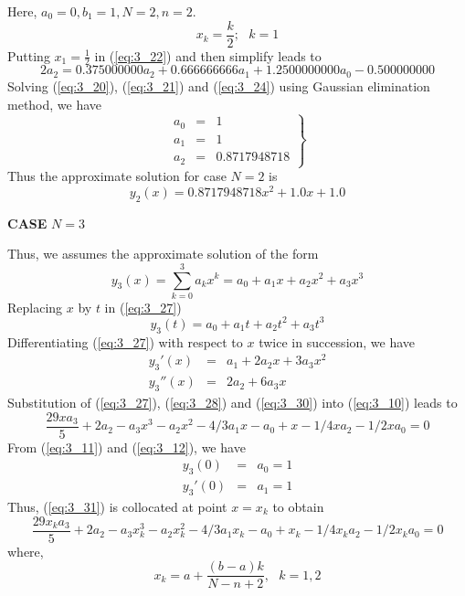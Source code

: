 \documentclass[12pt]{report}
\newcommand{\sps}{\\[0.2cm]}
\newcommand{\refn}[1]{(\ref{#1})}
\newcommand{\bt}[1]{\textbf{#1}}
\newcommand{\sprime}{'}
\newcommand{\dprime}{''}
\begin{document}
	Here, $a_0=0, b_1=1, N=2, n=2$.
	\begin{equation*}
		x_k = \frac{k}{2}; ~~~ k = 1
	\end{equation*}
	Putting $x_1 = \frac{1}{2}$ in \refn{eq:3_22} and then simplify leads to
	\begin{equation}
		2a_2 = 0.375000000a_2 + 0.666666666a_1 + 1.2500000000a_0 - 0.500000000 \label{eq:3_24}
	\end{equation}
	Solving \refn{eq:3_20}, \refn{eq:3_21} and \refn{eq:3_24} using Gaussian elimination method, we have
	\begin{equation}
		\left. 
			\begin{array}{rcl}
				a_0 &=&1\sps
				a_1 &=&1 \sps
				a_2 &=&0.8717948718
			\end{array}
		\right\}
		\label{eq:3_25}
	\end{equation}
	Thus the approximate solution for case $N=2$ is 
	\begin{equation}
		y_2(x) = 0.8717948718x^2 + 1.0x+1.0 \label{eq:2_26}
	\end{equation}
	\begin{center}
		\large \bt{CASE} $N=3$
	\end{center}
	Thus, we assumes the approximate solution of the form
	\begin{equation}
		y_3(x) = \sum_{k=0}^{3}a_kx^k = a_0 +a_1x+a_2x^2+a_3x^3 \label{eq:3_27}
	\end{equation}
	Replacing $x$ by $t$ in \refn{eq:3_27}
	\begin{equation}
		y_3(t) = a_0 +a_1t+a_2t^2+a_3t^3 \label{eq:3_28}
	\end{equation}
	Differentiating \refn{eq:3_27} with respect to $x$ twice in succession, we have
	\begin{eqnarray}
		y_3\sprime(x) &=& a_1 + 2a_2x + 3a_3x^2 \label{eq:3_29}\sps
		y_3\dprime(x) &=& 2a_2 + 6a_3x \label{eq:3_30}
	\end{eqnarray}
	Substitution of \refn{eq:3_27}, \refn{eq:3_28} and \refn{eq:3_30} into \refn{eq:3_10} leads to
	\begin{equation}
		\frac{29xa_3}{5} + 2a_2 - a_3x^3 - a_2x^2 - 4/3a_1x - a_0 + x-1/4xa_2 -  1/2xa_0 = 0 \label{eq:3_31}
	\end{equation}
	From \refn{eq:3_11} and \refn{eq:3_12}, we have
	\begin{eqnarray}
		y_3(0) &=& a_0 = 1 \label{eq:3_32}\sps
		y_3\sprime(0) &=& a_1 = 1 \label{eq:3_33}
	\end{eqnarray}
	Thus, \refn{eq:3_31} is collocated at point $x=x_k$ to obtain
	\begin{equation}
		\frac{29x_ka_3}{5} + 2a_2 - a_3x_k^3 - a_2x_k^2 - 4/3a_1x_k - a_0 + x_k - 1/4x_ka_2 -  1/2x_ka_0 = 0 \label{eq:3_34}
	\end{equation}
	where,
	\begin{equation}
		x_k = a + \frac{(b-a)k}{N-n+2}, ~~~ k=1,2 \label{eq:3_35}
	\end{equation}
	
\end{document}
